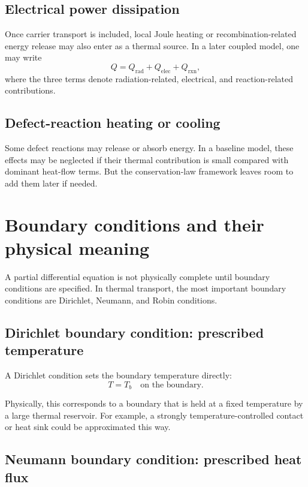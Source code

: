 \documentclass[11pt]{article}
\begin{document}
\subsection{Electrical power dissipation}

Once carrier transport is included, local Joule heating or recombination-related energy release may also enter as a thermal source. In a later coupled model, one may write
\[
Q = Q_{\mathrm{rad}} + Q_{\mathrm{elec}} + Q_{\mathrm{rxn}},
\]
where the three terms denote radiation-related, electrical, and reaction-related contributions.

\subsection{Defect-reaction heating or cooling}

Some defect reactions may release or absorb energy. In a baseline model, these effects may be neglected if their thermal contribution is small compared with dominant heat-flow terms. But the conservation-law framework leaves room to add them later if needed.

\section{Boundary conditions and their physical meaning}

A partial differential equation is not physically complete until boundary conditions are specified. In thermal transport, the most important boundary conditions are Dirichlet, Neumann, and Robin conditions.

\subsection{Dirichlet boundary condition: prescribed temperature}

A Dirichlet condition sets the boundary temperature directly:
\[
T = T_b \quad \text{on the boundary.}
\]

Physically, this corresponds to a boundary that is held at a fixed temperature by a large thermal reservoir. For example, a strongly temperature-controlled contact or heat sink could be approximated this way.

\subsection{Neumann boundary condition: prescribed heat flux}
\end{document}
